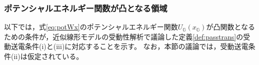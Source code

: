 \documentclass[tombow,dvipdfmx]{corona-a5-1.1}
\begin{document}
%
%

\subsubsection{ポテンシャルエネルギー関数が凸となる領域}

以下では，式\ref{eq:potWx}のポテンシャルエネルギー関数$U_{\mathds{G}}(x_{\mathds{G}})$が凸関数となるための条件が，近似線形モデルの受動性解析で議論した定義\ref{def:passtrans}の受動送電条件(i)と(iii)に対応することを示す。
なお，本節の議論では，受動送電条件(ii)は仮定されている。
\end{document}
